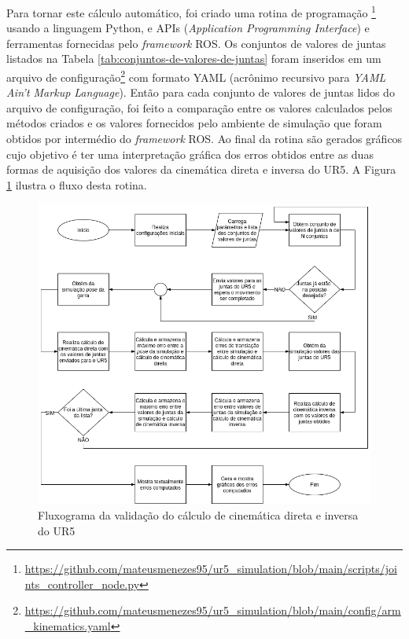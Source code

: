 Para tornar este cálculo automático, foi criado uma rotina de programação
\footnote{\url{https://github.com/mateusmenezes95/ur5_simulation/blob/main/scripts/joints_controller_node.py}}
usando a linguagem Python, e APIs 
(\textit{Application Programming Interface}) e ferramentas fornecidas pelo \textit{framework}
ROS. Os conjuntos de valores de juntas listados na Tabela \ref{tab:conjuntos-de-valores-de-juntas} foram inseridos em um arquivo
de configuração\footnote{\url{https://github.com/mateusmenezes95/ur5_simulation/blob/main/config/arm_kinematics.yaml}} 
com formato YAML (acrônimo recursivo para \textit{YAML Ain't Markup Language}).
Então para cada conjunto de valores de juntas lidos do arquivo de configuração, foi feito
a comparação entre os valores calculados pelos métodos criados e os valores fornecidos pelo 
ambiente de simulação que foram obtidos por intermédio do \textit{framework} ROS.
Ao final da rotina são gerados gráficos cujo objetivo é ter uma interpretação gráfica dos erros
obtidos entre as duas formas de aquisição dos valores da cinemática direta e inversa do UR5.
A Figura \ref{fig:fluxograma-rotina} ilustra o fluxo desta rotina.

\begin{figure}[htp]
	\centering
	\caption{Fluxograma da validação do cálculo de cinemática direta e inversa do UR5}
	\label{fig:fluxograma-rotina}
	\includegraphics[width=\textwidth]{images/fluxograma_da_validacao_do_calculo_de_cinematica_direta_e_inversa.png}
\end{figure} 

